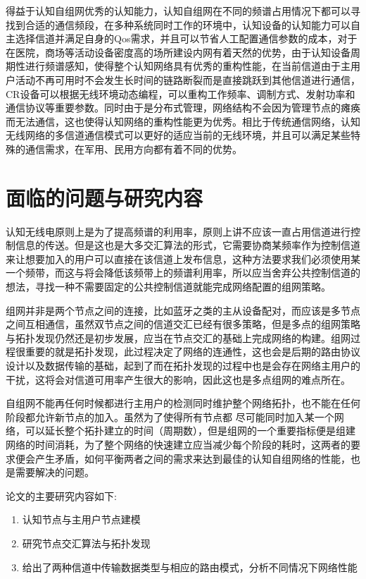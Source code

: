 \documentclass[a4paper,AutoFakeBold,oneside,12pt]{book}
\begin{document}
  得益于认知自组网优秀的认知能力，认知自组网在不同的频谱占用情况下都可以寻找到合适的通信频段，在多种系统同时工作的环境中，认知设备的认知能力可以自主选择信道并满足自身的Qos需求，并且可以节省人工配置通信参数的成本，对于在医院，商场等活动设备密度高的场所建设内网有着天然的优势，由于认知设备周期性进行频谱感知，使得整个认知网络具有优秀的重构性能，在当前信道由于主用户活动不再可用时不会发生长时间的链路断裂而是直接跳跃到其他信道进行通信，CR设备可以根据无线环境动态编程，可以重构工作频率、调制方式、发射功率和通信协议等重要参数。同时由于是分布式管理，网络结构不会因为管理节点的瘫痪而无法通信，这也使得认知网络的重构性能更为优秀。相比于传统通信网络，认知无线网络的多信道通信模式可以更好的适应当前的无线环境，并且可以满足某些特殊的通信需求，在军用、民用方向都有着不同的优势。

\section{面临的问题与研究内容}
  认知无线电原则上是为了提高频谱的利用率，原则上讲不应该一直占用信道进行控制信息的传送。但是这也是大多交汇算法的形式，它需要协商某频率作为控制信道来让想要加入的用户可以直接在该信道上发布信息，这种方法要求我们必须使用某一个频带，而这与将会降低该频带上的频谱利用率，所以应当舍弃公共控制信道的想法，寻找一种不需要固定的公共控制信道就能完成网络配置的组网策略。

  组网并非是两个节点之间的连接，比如蓝牙之类的主从设备配对，而应该是多节点之间互相通信，虽然双节点之间的信道交汇已经有很多策略，但是多点的组网策略与拓扑发现仍然还是初步发展，应当在节点交汇的基础上完成网络的构建。组网过程很重要的就是拓扑发现，此过程决定了网络的连通性，这也会是后期的路由协议设计以及数据传输的基础，起到了而在拓扑发现的过程中也是会存在网络主用户的干扰，这将会对信道可用率产生很大的影响，因此这也是多点组网的难点所在。
 
 自组网不能再任何时候都进行主用户的检测同时维护整个网络拓扑，也不能在任何阶段都允许新节点的加入。虽然为了使得所有节点都 尽可能同时加入某一个网络，可以延长整个拓扑建立的时间（周期数），但是组网的一个重要指标便是组建网络的时间消耗，为了整个网络的快速建立应当减少每个阶段的耗时，这两者的要求便会产生矛盾，如何平衡两者之间的需求来达到最佳的认知自组网络的性能，也是需要解决的问题。

    论文的主要研究内容如下:
\begin{enumerate}[\indent (1)] %
\item 认知节点与主用户节点建模
\item  研究节点交汇算法与拓扑发现
\item  给出了两种信道中传输数据类型与相应的路由模式，分析不同情况下网络性能
\end{enumerate}
\end{document}
